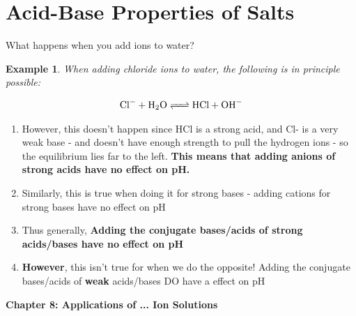 \documentclass{article}  %
\newtheorem{exmp}{Example}
\begin{document}
\section*{Acid-Base Properties of Salts}
What happens when you add ions to water? 
\newline
\begin{exmp}
    When adding chloride ions to water, the following is in principle possible:
\end{exmp}
\begin{equation*}
    \begin{aligned}
        \ce{Cl- + H2O <=> HCl + OH-}
    \end{aligned}
\end{equation*}
\begin{enumerate}
    \item However, this doesn't happen since HCl is a strong acid, and Cl- is a very weak base - and doesn't have enough strength to pull the hydrogen ions - so the equilibrium lies far to the left. \textbf{This means that adding anions of strong acids have no effect on pH.} 
    \item Similarly, this is true when doing it for strong bases - adding cations for strong bases have no effect on pH
    \item Thus generally, \textbf{Adding the conjugate bases/acids of strong acids/bases have no effect on pH}
    \item \textbf{However}, this isn't true for when we do the opposite! Adding the conjugate bases/acids of \textbf{weak} acids/bases DO have a effect on pH 
\end{enumerate} 

\begin{center}
    \LARGE{\textbf{Chapter 8: Applications of ... Ion Solutions}}
\end{center}
\end{document}
